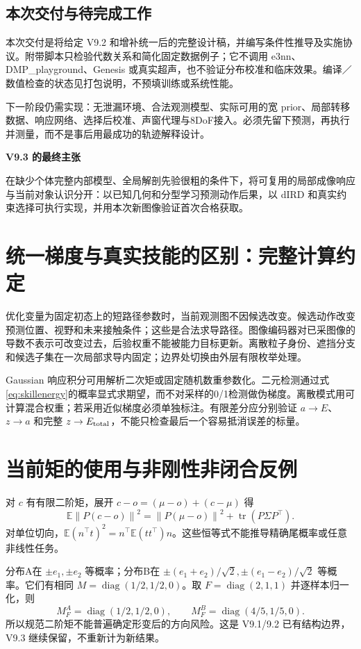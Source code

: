 \documentclass[UTF8,fontset=fandol,11pt,a4paper]{ctexart}
\theoremstyle{plain}
\theoremstyle{definition}
\theoremstyle{remark}
\numberwithin{equation}{section}
\newcommand{\E}{\mathbb E}
\newcommand{\norm}[1]{\left\lVert#1\right\rVert}
\DeclareMathOperator{\tr}{tr}
\DeclareMathOperator{\diag}{diag}
\begin{document}
\subsection{本次交付与待完成工作}
本次交付是将给定 V9.2 和增补统一后的完整设计稿，并编写条件性推导及实施协议。附带脚本只检验代数关系和简化固定数据例子；它不调用 e3nn、DMP\_playground、Genesis 或真实超声，也不验证分布校准和临床效果。编译／数值检查的状态见打包说明，不预填训练或系统性能。

下一阶段仍需实现：无泄漏环境、合法观测模型、实际可用的宽 prior、局部转移数据、响应网络、选择后校准、声窗代理与8DoF接入。必须先留下预测，再执行并测量，而不是事后用最成功的轨迹解释设计。

\begin{corebox}
\textbf{V9.3 的最终主张}\par
在缺少个体完整内部模型、全局解剖先验很粗的条件下，将可复用的局部成像响应与当前对象认识分开：以已知几何和分型学习预测动作后果，以 dIRD 和真实约束选择可执行实现，并用本次新图像验证首次合格获取。
\end{corebox}

\appendix
\section{统一梯度与真实技能的区别：完整计算约定}
\label{app:gradient}
优化变量为固定初态上的短路径参数时，当前观测图不因候选改变。候选动作改变预测位置、视野和未来接触条件；这些是合法求导路径。图像编码器对已采图像的导数不表示可改变过去，后验权重不能被能力目标更新。离散粒子身份、遮挡分支和候选子集在一次局部求导内固定；边界处切换由外层有限枚举处理。

Gaussian 响应积分可用解析二次矩或固定随机数重参数化。二元检测通过式\eqref{eq:skillenergy}的概率显式求期望，而不对采样的0/1检测做伪梯度。离散模式用可计算混合权重；若采用近似梯度必须单独标注。有限差分应分别验证 $a\to E$、$z\to a$ 和完整 $z\to E_{\rm total}$，不能只检查最后一个容易抵消误差的标量。

\section{当前矩的使用与非刚性非闭合反例}
\label{app:moments}
对 $c$ 有有限二阶矩，展开 $c-o=(\mu-o)+(c-\mu)$ 得
\[
\E\norm{P(c-o)}^2=\norm{P(\mu-o)}^2+\tr(P\Sigma P^\top).
\]
对单位切向，$\E(n^\top t)^2=n^\top\E(tt^\top)n$。这些恒等式不能推导精确尾概率或任意非线性任务。

分布A在 $\pm e_1,\pm e_2$ 等概率；分布B在 $\pm(e_1+e_2)/\sqrt2,\pm(e_1-e_2)/\sqrt2$ 等概率。它们有相同 $M=\diag(1/2,1/2,0)$。取 $F=\diag(2,1,1)$ 并逐样本归一化，则
\[
M_F^A=\diag(1/2,1/2,0),\qquad M_F^B=\diag(4/5,1/5,0).
\]
所以规范二阶矩不能普遍确定形变后的方向风险。这是 V9.1/9.2 已有结构边界，V9.3 继续保留，不重新计为新结果。
\end{document}
